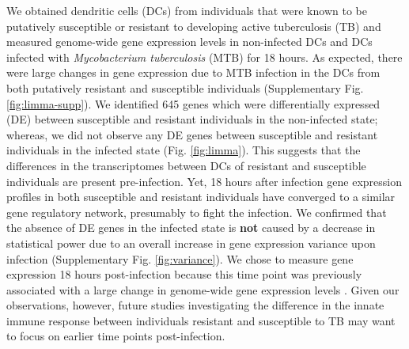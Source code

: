 \documentclass[fleqn,10pt]{wlscirep}
\begin{document}
We obtained dendritic cells (DCs) from individuals that were known to
be putatively susceptible or resistant to developing active
tuberculosis (TB) and measured genome-wide gene expression levels in
non-infected DCs and DCs infected with \emph{Mycobacterium
tuberculosis} (MTB) for 18 hours. As expected, there were large
changes in gene expression due to MTB infection in the DCs from both
putatively resistant and susceptible individuals (Supplementary Fig.
\ref{fig:limma-supp}). We identified 645 genes which were
differentially expressed (DE) between susceptible and resistant
individuals in the non-infected state; whereas, we did not observe any
DE genes between susceptible and resistant individuals in the infected
state (Fig. \ref{fig:limma}). This suggests that the differences in
the transcriptomes between DCs of resistant and susceptible
individuals are present pre-infection. Yet, 18 hours after infection
gene expression profiles in both susceptible and resistant individuals
have converged to a similar gene regulatory network, presumably to
fight the infection. We confirmed that the absence of DE genes in the
infected state is \textbf{not} caused by a decrease in statistical
power due to an overall increase in gene expression variance upon
infection (Supplementary Fig. \ref{fig:variance}). We chose to measure
gene expression 18 hours post-infection because this time point was
previously associated with a large change in genome-wide gene
expression levels \cite{Tailleux2008}. Given our observations,
however, future studies investigating the difference in the innate
immune response between individuals resistant and susceptible to TB
may want to focus on earlier time points post-infection.
\end{document}
